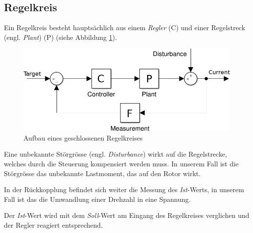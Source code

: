 \subsection{Regelkreis}

Ein Regelkreis besteht haupts\"achlich aus einem \textit{Regler} (C) und einer
Regelstreck      (engl.      \textit{Plant})     (P)     (siehe      Abbildung
\ref{fig:control-loop}).

\begin{figure}
    \centering
    \includegraphics[width=\imagewidth]{images/control_loop}
    \caption{Aufbau eines geschlossenen Regelkreises}
    \label{fig:control-loop}
\end{figure}

Eine  unbekannte St\"orgr\"osse (engl.  \textit{Disturbance})  wirkt  auf  die
Regelstrecke, welches durch die Steuerung kompensiert werden muss.  In unserem
Fall ist die St\"orgr\"osse das  unbekannte  Lastmoment,  das  auf  den  Rotor
wirkt.

In der R\"uckkopplung befindet sich weiter die Messung des \textit{Ist}-Werts,
in  unserem Fall ist das die  Umwandlung  einer  Drehzahl  in  eine  Spannung.

Der  \textit{Ist}-Wert  wird  mit   dem   \textit{Soll}-Wert  am  Eingang  des
Regelkreises verglichen und der Regler reagiert entsprechend.

